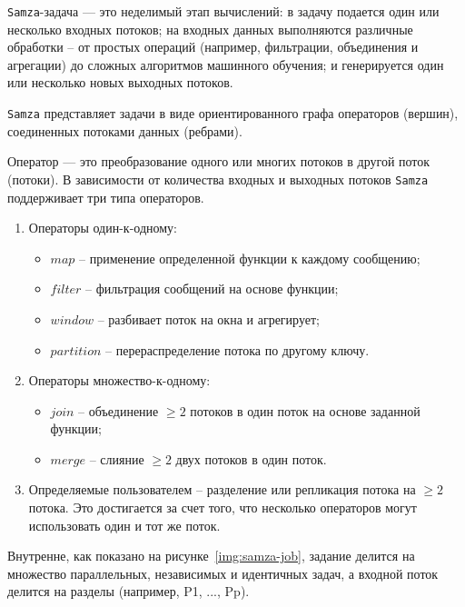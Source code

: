 \texttt{Samza}-задача --- это неделимый этап вычислений: в задачу подается один или несколько входных потоков; на входных данных выполняются различные обработки -- от простых операций (например, фильтрации, объединения и агрегации) до сложных алгоритмов машинного обучения; и генерируется один или несколько новых выходных потоков.

\texttt{Samza} представляет задачи в виде ориентированного графа операторов (вершин), соединенных потоками данных (ребрами).

Оператор --- это преобразование одного или многих потоков в другой поток (потоки). В зависимости от количества входных и выходных потоков \texttt{Samza} поддерживает три типа операторов.

\begin{enumerate}
  \item Операторы один-к-одному:
    \begin{itemize}
      \item $map$ -- применение определенной функции к каждому сообщению; 
      \item $filter$ -- фильтрация сообщений на основе функции;
      \item $window$ -- разбивает поток на окна и агрегирует;
      \item $partition$ -- перераспределение потока по другому ключу.
    \end{itemize}
  \item Операторы множество-к-одному:
    \begin{itemize}
      \item $join$ -- объединение $\geq 2$ потоков в один поток на основе заданной функции;
      \item $merge$ -- слияние $\geq 2$ двух потоков в один поток.
    \end{itemize}
    \clearpage
  \item Определяемые пользователем -- разделение или репликация потока на $\geq 2$ потока. Это достигается за счет того, что несколько операторов могут использовать один и тот же поток.
\end{enumerate}

Внутренне, как показано на рисунке~\ref{img:samza-job}, задание делится на множество параллельных, независимых и идентичных задач, а входной поток делится на разделы (например, {P1, ..., Pp}). 


